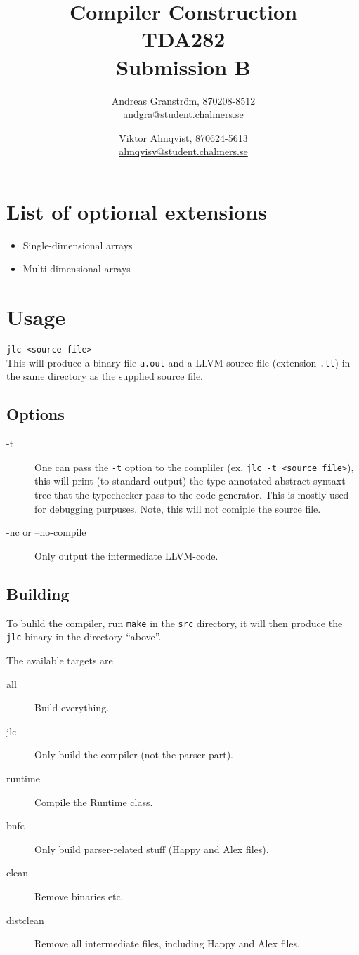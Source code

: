 \documentclass[a4paper,10pt]{article}
\title{{\sc Compiler Construction}\\ TDA282 \\ Submission B}
\author{Andreas Granstr\"om, 870208-8512 \\ \url{andgra@student.chalmers.se} \and Viktor Almqvist, 870624-5613 \\ \url{almqvisv@student.chalmers.se}}
\begin{document}
\maketitle


\section{List of optional extensions}
\begin{itemize}
\item Single-dimensional arrays
\item Multi-dimensional arrays
\end{itemize}

\section{Usage}
\texttt{jlc <source file>} \\ This will produce a binary file
\texttt{a.out} and a LLVM source file (extension \texttt{.ll}) in the
same directory as the supplied source file.

\subsection{Options}
\begin{description}
\item[-t] One can pass the \texttt{-t} option to the compliler
  (ex. \texttt{jlc -t <source file>}), this will print (to standard
  output) the type-annotated abstract syntaxt-tree that the
  typechecker pass to the code-generator. This is mostly used for
  debugging purpuses. Note, this will not comiple the source file.
\item[-nc or --no-compile] Only output the intermediate LLVM-code.
\end{description}

\subsection{Building}
To bulild the compiler, run \texttt{make} in the \texttt{src} directory, it will then produce the \texttt{jlc} binary in the directory ``above''.

The available targets are
\begin{description}
\item[all] Build everything.
\item[jlc] Only build the compiler (not the parser-part).
\item[runtime] Compile the Runtime class.
\item[bnfc] Only build parser-related stuff (Happy and Alex files).
\item[clean] Remove binaries etc.
\item[distclean] Remove all intermediate files, including Happy and Alex files.
\end{description}
\end{document}
